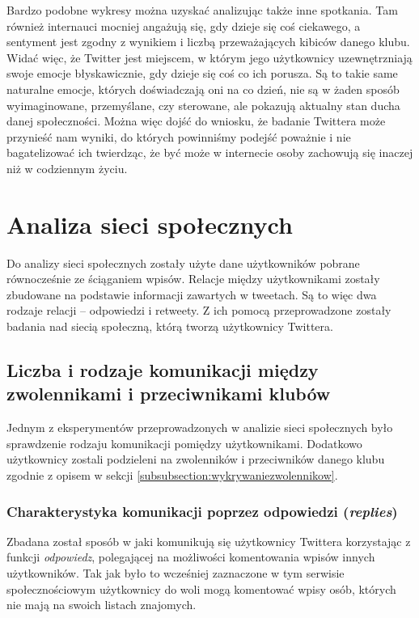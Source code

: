 Bardzo podobne wykresy można uzyskać analizując także inne spotkania.
Tam również internauci mocniej angażują się, gdy dzieje się coś ciekawego, a
sentyment jest zgodny z wynikiem i liczbą przeważających kibiców danego klubu.
Widać więc, że Twitter jest miejscem, w którym jego użytkownicy uzewnętrzniają
swoje emocje błyskawicznie, gdy dzieje się coś co ich porusza.
Są to takie same naturalne emocje, których doświadczają oni na co dzień, nie są
w żaden sposób wyimaginowane, przemyślane, czy sterowane, ale pokazują aktualny
stan ducha danej społeczności. Można więc dojść do wniosku, że badanie Twittera
może przynieść nam wyniki, do których powinniśmy podejść poważnie i nie
bagatelizować ich twierdząc, że być może w internecie osoby zachowują się
inaczej niż w codziennym życiu.





\section{Analiza sieci społecznych}
\label{section:analizaspoleczna}
Do analizy sieci społecznych zostały użyte dane użytkowników pobrane 
równocześnie ze ściąganiem wpisów. Relacje między użytkownikami zostały
zbudowane na podstawie informacji zawartych w tweetach. Są to więc
dwa rodzaje relacji -- odpowiedzi i retweety. Z ich pomocą przeprowadzone
zostały badania nad siecią społeczną, którą tworzą użytkownicy Twittera. 






\subsection{Liczba i rodzaje komunikacji między zwolennikami i przeciwnikami klubów}
\label{subsection:rodzajekomunikacji}

Jednym z eksperymentów przeprowadzonych w analizie sieci społecznych było
sprawdzenie rodzaju komunikacji pomiędzy użytkownikami. 
Dodatkowo użytkownicy zostali podzieleni na zwolenników i przeciwników danego 
klubu zgodnie z opisem w sekcji \ref{subsubsection:wykrywaniezwolennikow}.


\subsubsection{Charakterystyka komunikacji poprzez odpowiedzi (\textit{replies})}
Zbadana został sposób w jaki komunikują się użytkownicy Twittera korzystając
z funkcji \textit{odpowiedz}, polegającej na możliwości komentowania wpisów
innych użytkowników. Tak jak było to wcześniej zaznaczone w tym serwisie
społecznościowym użytkownicy do woli mogą komentować wpisy osób, których
nie mają na swoich listach znajomych.

